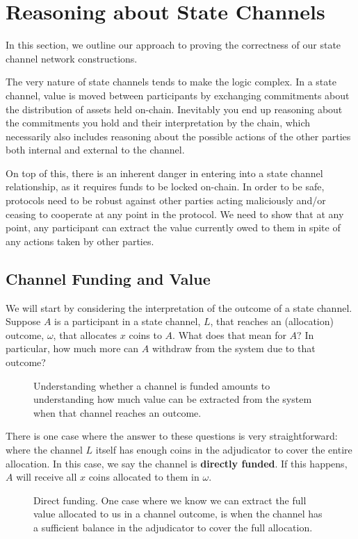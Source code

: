 \section{Reasoning about State Channels}\label{sec:reasoning}

In this section, we outline our approach to proving the correctness of our state channel network constructions.

The very nature of state channels tends to make the logic complex.
In a state channel, value is moved between participants by exchanging commitments about the distribution of assets held on-chain.
Inevitably you end up reasoning about the commitments you hold and their interpretation by the chain, which necessarily also includes reasoning about the possible actions of the other parties both internal and external to the channel.

On top of this, there is an inherent danger in entering into a state channel relationship, as it requires funds to be locked on-chain.
In order to be safe, protocols need to be robust against other parties acting maliciously and/or ceasing to cooperate at any point in the protocol.
We need to show that at any point, any participant can extract the value currently owed to them in spite of any actions taken by other parties.

\subsection{Channel Funding and Value}

We will start by considering the interpretation of the outcome of a state channel.
Suppose $A$ is a participant in a state channel, $L$, that reaches an (allocation) outcome, $\omega$, that allocates $x$ coins to $A$.
What does that mean for $A$?
In particular, how much more can $A$ withdraw from the system due to that outcome?

\begin{figure}[h]\centering
  \makebox[\textwidth][c]{}
  \caption{
    Understanding whether a channel is funded amounts to understanding how much value can be extracted from the system when that channel reaches an outcome.
  }\label{fig:meaning-of-funding}
\end{figure}

There is one case where the answer to these questions is very straightforward:
where the channel $L$ itself has enough coins in the adjudicator to cover the entire allocation.
In this case, we say the channel is \textbf{directly funded}.
If this happens, $A$ will receive all $x$ coins allocated to them in $\omega$.
\begin{figure}[h]\centering
  \makebox[\textwidth][c]{}
  \caption{
    Direct funding.
    One case where we know we can extract the full value allocated to us in a channel outcome, is when the channel has a sufficient balance in the adjudicator to cover the full allocation.
  }\label{fig:direct-funding}
\end{figure}

